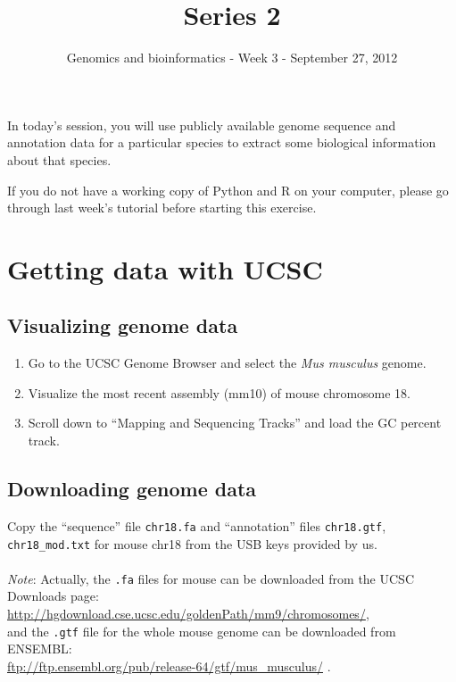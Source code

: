 \documentclass[a4paper,11pt]{article}
\title{Series 2}
\date{}
\author{Genomics and bioinformatics - Week 3 - September 27, 2012}
\begin{document}
\maketitle


In today's session, you will use publicly available genome sequence and annotation data for a particular species
to extract some biological information about that species.

If you do not have a working copy of Python and R on your computer, please go through last week's tutorial before starting this exercise.



\section{Getting data with UCSC}
\subsection{Visualizing genome data}
\begin{enumerate}
\item Go to the UCSC Genome Browser and select the \textit{Mus musculus} genome.
\item Visualize the most recent assembly (mm10) of mouse chromosome 18.
\item Scroll down to ``Mapping and Sequencing Tracks'' and load the GC percent track.
\end{enumerate}

\subsection{Downloading genome data}
Copy the ``sequence'' file \texttt{chr18.fa} and ``annotation'' files \texttt{chr18.gtf}, \texttt{chr18\_mod.txt} 
for mouse chr18 from the USB keys provided by us. \\\\
\textit{Note}: Actually, the \texttt{.fa} files for mouse can be downloaded from the UCSC Downloads page:\\
\url{http://hgdownload.cse.ucsc.edu/goldenPath/mm9/chromosomes/},\\
and the \texttt{.gtf} file for the whole mouse genome can be downloaded from ENSEMBL:\\
\url{ftp://ftp.ensembl.org/pub/release-64/gtf/mus_musculus/} .
\end{document}
